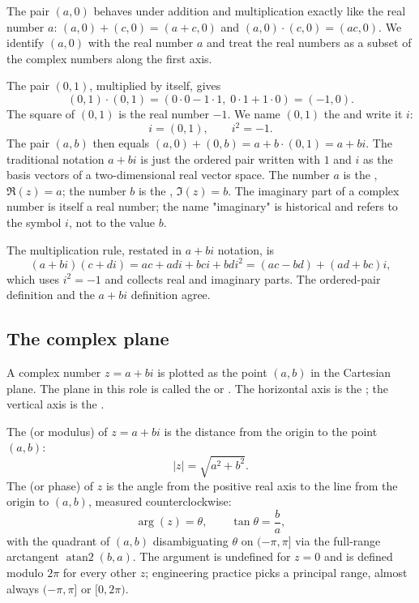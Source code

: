 The pair $(a, 0)$ behaves under addition and multiplication exactly
like the real number $a$: $(a, 0) + (c, 0) = (a + c, 0)$ and
$(a, 0) \cdot (c, 0) = (ac, 0)$. We identify $(a, 0)$ with the
real number $a$ and treat the real numbers as a subset of the
complex numbers along the first axis.

The pair $(0, 1)$, multiplied by itself, gives
\[
(0, 1) \cdot (0, 1) = (0 \cdot 0 - 1 \cdot 1,\; 0 \cdot 1 + 1 \cdot 0) = (-1, 0).
\]
The square of $(0, 1)$ is the real number $-1$. We name $(0, 1)$
the  and write it $i$:
\[
i = (0, 1), \qquad i^{2} = -1.
\]
The pair $(a, b)$ then equals $(a, 0) + (0, b) = a + b \cdot (0, 1)
= a + bi$. The traditional notation $a + bi$ is just the ordered
pair written with $1$ and $i$ as the basis vectors of a
two-dimensional real vector space. The number $a$ is the
, $\Re(z) = a$; the number $b$ is the
, $\Im(z) = b$. The imaginary part of a
complex number is itself a real number; the name "imaginary" is
historical and refers to the symbol $i$, not to the value $b$.

The multiplication rule, restated in $a + bi$ notation, is
\[
(a + bi)(c + di) = ac + adi + bci + bdi^{2} = (ac - bd) + (ad + bc)i,
\]
which uses $i^{2} = -1$ and collects real and imaginary parts. The
ordered-pair definition and the $a + bi$ definition agree.

\subsection{The complex plane}

A complex number $z = a + bi$ is plotted as the point $(a, b)$ in
the Cartesian plane. The plane in this role is called the
 or . The horizontal
axis is the ; the vertical axis is the
.

The  (or modulus) of $z = a + bi$ is the
distance from the origin to the point $(a, b)$:
\[
|z| = \sqrt{a^{2} + b^{2}}.
\]
The  (or phase) of $z$ is the angle from the
positive real axis to the line from the origin to $(a, b)$,
measured counterclockwise:
\[
\arg(z) = \theta, \qquad \tan\theta = \frac{b}{a},
\]
with the quadrant of $(a, b)$ disambiguating $\theta$ on
$(-\pi, \pi]$ via the full-range arctangent
$\operatorname{atan2}(b, a)$. The argument is undefined for $z = 0$
and is defined modulo $2\pi$ for every other $z$; engineering
practice picks a principal range, almost always $(-\pi, \pi]$ or
$[0, 2\pi)$.


